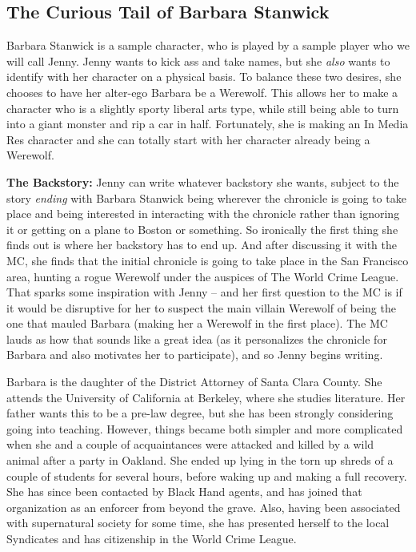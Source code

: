 \subsection[Barbara Stanwick]{The Curious Tail of Barbara Stanwick}

\hspace{\parindent} Barbara Stanwick is a sample character, who is played by a sample player who we will call Jenny. Jenny wants to kick ass and take names, but she \textit{also} wants to identify with her character on a physical basis. To balance these two desires, she chooses to have her alter-ego Barbara be a Werewolf. This allows her to make a character who is a slightly sporty liberal arts type, while still being able to turn into a giant monster and rip a car in half. Fortunately, she is making an In Media Res character and she can totally start with her character already being a Werewolf.

\textbf{The Backstory:} Jenny can write whatever backstory she wants, subject to the story \textit{ending} with Barbara Stanwick being wherever the chronicle is going to take place and being interested in interacting with the chronicle rather than ignoring it or getting on a plane to Boston or something. So ironically the first thing she finds out is where her backstory has to end up. And after discussing it with the MC, she finds that the initial chronicle is going to take place in the San Francisco area, hunting a rogue Werewolf under the auspices of The World Crime League. That sparks some inspiration with Jenny -- and her first question to the MC is if it would be disruptive for her to suspect the main villain Werewolf of being the one that mauled Barbara (making her a Werewolf in the first place). The MC lauds as how that sounds like a great idea (as it personalizes the chronicle for Barbara and also motivates her to participate), and so Jenny begins writing.

Barbara is the daughter of the District Attorney of Santa Clara County. She attends the University of California at Berkeley, where she studies literature. Her father wants this to be a pre-law degree, but she has been strongly considering going into teaching. However, things became both simpler and more complicated when she and a couple of acquaintances were attacked and killed by a wild animal after a party in Oakland. She ended up lying in the torn up shreds of a couple of students for several hours, before waking up and making a full recovery. She has since been contacted by Black Hand agents, and has joined that organization as an enforcer from beyond the grave. Also, having been associated with supernatural society for some time, she has presented herself to the local Syndicates and has citizenship in the World Crime League.

